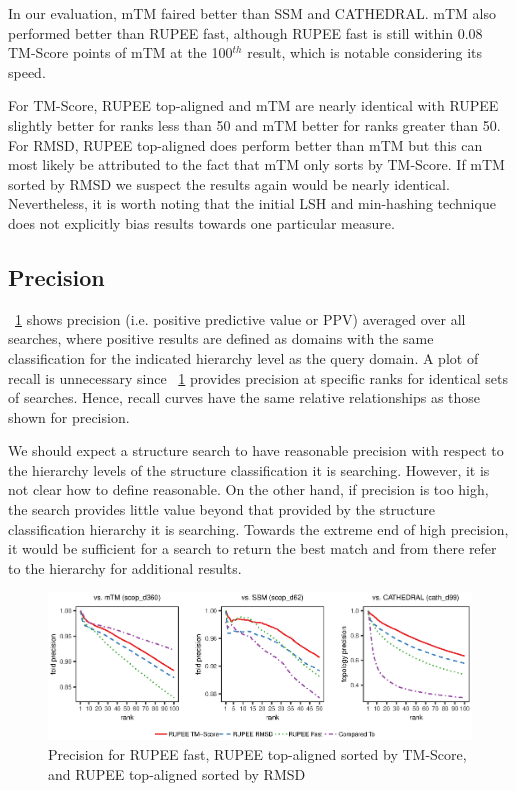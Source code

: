 \documentclass[letter,center,fleqn]{NAR}
\begin{document}
In our evaluation, mTM faired better than SSM and CATHEDRAL. 
mTM also performed better than RUPEE fast, although RUPEE fast is still within 0.08 TM-Score points of mTM at the 100$^{th}$ result, which is notable considering its speed.

For TM-Score, RUPEE top-aligned and mTM are nearly identical with RUPEE slightly better for ranks less than 50 and mTM better for ranks greater than 50. 
For RMSD, RUPEE top-aligned does perform better than mTM but this can most likely be attributed to the fact that mTM only sorts by TM-Score. 
If mTM sorted by RMSD we suspect the results again would be nearly identical.
Nevertheless, it is worth noting that the initial LSH and min-hashing technique does not explicitly bias results towards one particular measure. 

\subsection{Precision}

\figurename~\ref{fig:combined_precision} shows precision (i.e. positive predictive value or PPV) averaged over all searches, where positive results are defined as domains with the same classification for the indicated hierarchy level as the query domain. 
A plot of recall is unnecessary since \figurename~\ref{fig:combined_precision} provides precision at specific ranks for identical sets of searches. 
Hence, recall curves have the same relative relationships as those shown for precision. 

We should expect a structure search to have reasonable precision with respect to the hierarchy levels of the structure classification it is searching. 
However, it is not clear how to define reasonable. 
On the other hand, if precision is too high, the search provides little value beyond that provided by the structure classification hierarchy it is searching. 
Towards the extreme end of high precision, it would be sufficient for a search to return the best match and from there refer to the hierarchy for additional results. 

\begin{figure}[tb]
\begin{center}
\includegraphics{combined_precision}
\end{center}
\caption{Precision for RUPEE fast, RUPEE top-aligned sorted by TM-Score, and RUPEE top-aligned sorted by RMSD}
\label{fig:combined_precision}
\end{figure}
\end{document}
